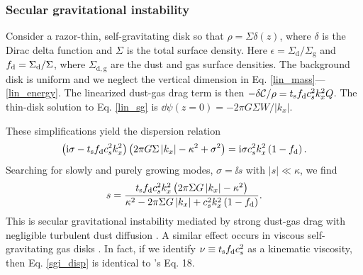  




\subsubsection{Secular gravitational instability}\label{sgi}
Consider a razor-thin, self-gravitating disk so that $\rho =
\Sigma\delta(z)$, where $\delta$ is the Dirac delta function and $\Sigma$ is
the total surface density. Here $\epsilon = \Sigma_\mathrm{d}/\Sigma_\mathrm{g}$ and 
$f_\mathrm{d}=\Sigma_\mathrm{d}/\Sigma$, where $\Sigma_\mathrm{d,g}$ are the dust and gas surface densities. 
The background disk is 
uniform and we neglect the vertical dimension   
in Eq. \ref{lin_mass}---\ref{lin_energy}. The linearized dust-gas drag
term is then $-\delta\mathcal{C}/\rho = t_\mathrm{s}f_\mathrm{d} c_s^2k_x^2
Q$. The thin-disk solution to Eq. \ref{lin_sg} is $\dd\psi(z=0) = -2\pi G
\Sigma W/\left|k_x\right|$.%

These simplifications yield the dispersion relation
\begin{align*}
  \left(\mathrm{i}\sigma - t_\mathrm{s}f_\mathrm{d} c_s^2k_x^2\right)\left( 2 \pi G
    \Sigma \left|k_x\right|  - \kappa^2 + \sigma^2 \right) = \mathrm{i}
  \sigma c_s^2 k_x^2\left(1 - f_\mathrm{d}\right). 
\end{align*}
Searching for slowly and purely growing modes, $\sigma = \ii s$ with 
$|s|\ll \kappa$, we find 
\begin{align}  
s = \frac{t_\mathrm{s}f_\mathrm{d} c_s^2 k_x^2 \left( 2 \pi \Sigma G
    \left|k_x\right| - \kappa^2\right)}{\kappa^2 -2 \pi \Sigma G
    \left|k_x\right| + c_s^2k_x^2\left(1-f_\mathrm{d}\right) }. \label{sgi_disp}
\end{align}
This is secular gravitational instability mediated by strong
dust-gas drag with negligible turbulent dust diffusion 
\citep[][ their Eq. 13 becomes our Eq. \ref{sgi_disp} in this limit
after 
a change of variables]{takahashi14}. A similar effect occurs in viscous
self-gravitating gas disks \citep{gammie96,lin16}. In fact, if we
identify $\nu \equiv t_\mathrm{s} f_\mathrm{d} c_s^2$ as a kinematic viscosity,
then Eq. \ref{sgi_disp} is identical to \citeauthor{gammie96}'s Eq. 18. 

